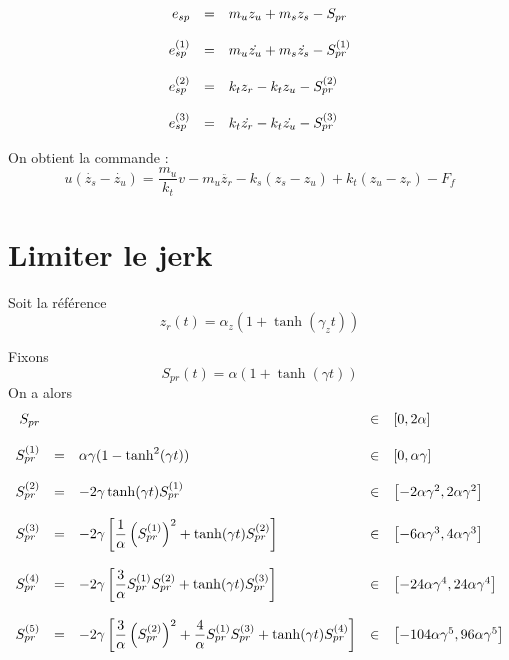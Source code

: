 \documentclass[10pt]{article}
\begin{document}
\[
\begin{array}{r c l}
  e_{sp} &=& m_u z_u + m_s z_s - S_{pr} \\
  \\
  e_{sp}^{(1)} &=& m_u \dot{z_u} + m_s \dot{z_s} - S_{pr}^{(1)} \\
  \\
  e_{sp}^{(2)} &=& k_t z_r - k_t z_u - S_{pr}^{(2)} \\
  \\
  e_{sp}^{(3)} &=& k_t \dot{z_r} - k_t \dot{z_u} - S_{pr}^{(3)} \\
\end{array}
\]

On obtient la commande :
\[
u \left( \dot{z_s} - \dot{z_u} \right) = \dfrac{m_u}{k_t} v - m_u \ddot{z_r} - k_s \left( z_s - z_u \right) + k_t \left( z_u - z_r \right) - F_f
\]

\section{Limiter le jerk}

Soit la référence
\[
z_{r}(t) = \alpha_z \left( 1 + \tanh(\gamma_z t) \right)
\]

Fixons
\[
S_{pr}(t) = \alpha \left( 1 + \tanh(\gamma t) \right)
\]
On a alors
\[
\begin{array}{r c l l l}
  S_{pr} && &\in&\left[ 0, 2\alpha \right] \\
  \\
  S_{pr}^{(1)} &=& \alpha \gamma (1 - \tanh^2(\gamma t)) &\in& \left[ 0, \alpha \gamma \right] \\
  \\
  S_{pr}^{(2)} &=& -2 \gamma \tanh(\gamma t) S_{pr}^{(1)} &\in& \left[ -2 \alpha \gamma^2, 2 \alpha \gamma^2 \right] \\
  \\
  S_{pr}^{(3)} &=& -2 \gamma \left[ \dfrac{1}{\alpha} \left( S_{pr}^{(1)} \right)^2 + \tanh(\gamma t) S_{pr}^{(2)} \right] &\in& \left[ -6 \alpha \gamma^3, 4 \alpha \gamma^3 \right] \\
  \\
  S_{pr}^{(4)} &=& -2 \gamma \left[ \dfrac{3}{\alpha} S_{pr}^{(1)} S_{pr}^{(2)} + \tanh(\gamma t) S_{pr}^{(3)} \right] &\in& \left[ -24 \alpha \gamma^4, 24 \alpha \gamma^4 \right] \\
  \\
  S_{pr}^{(5)} &=& -2 \gamma \left[ \dfrac{3}{\alpha} \left( S_{pr}^{(2)} \right)^2 + \dfrac{4}{\alpha} S_{pr}^{(1)} S_{pr}^{(3)} + \tanh(\gamma t) S_{pr}^{(4)} \right] &\in& \left[ -104 \alpha \gamma^5, 96 \alpha \gamma^5 \right] \\
\end{array}
\]
\end{document}
